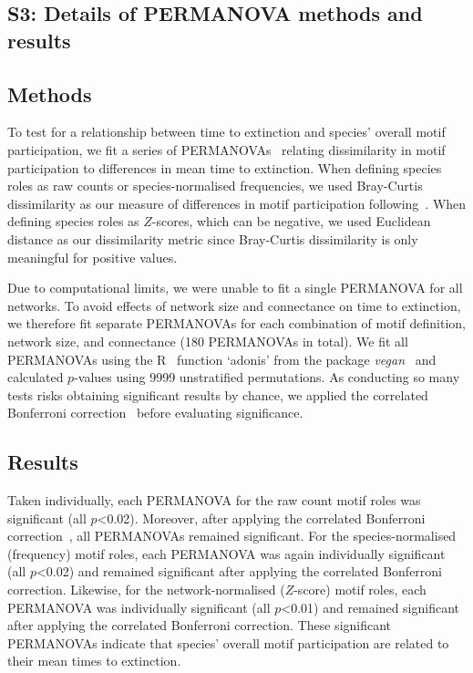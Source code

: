 \documentclass[12pt]{article}
\begin{document}
\begin{spacing}{2.0}
\clearpage


\section*{S3: Details of PERMANOVA methods and results}

	\subsection*{Methods}


		To test for a relationship between time to extinction and species' overall motif participation, we fit a series of PERMANOVAs~\citep{Anderson2001} relating dissimilarity in motif participation to differences in mean time to extinction.
		When defining species roles as raw counts or species-normalised frequencies, we used Bray-Curtis dissimilarity as our measure of differences in motif participation following~\citet{Baker2015,Cirtwill2015}.
		When defining species roles as $Z$-scores, which can be negative, we used Euclidean distance as our dissimilarity metric since Bray-Curtis dissimilarity is only meaningful for positive values.


		Due to computational limits, we were unable to fit a single PERMANOVA for all networks.
		To avoid effects of network size and connectance on time to extinction, we therefore fit separate PERMANOVAs for each combination of motif definition, network size, and connectance (180 PERMANOVAs in total).
		We fit all PERMANOVAs using the R~\citep{R} function `adonis' from the package \emph{vegan}~\citep{vegan} and calculated $p$-values using 9999 unstratified permutations.
		As conducting so many tests risks obtaining significant results by chance, we applied the correlated Bonferroni correction~\citep{Drezner2016} before evaluating significance.

	\subsection*{Results}


		Taken individually, each PERMANOVA for the raw count motif roles was significant (all $p$\textless0.02). Moreover, after applying the correlated Bonferroni correction~\citep{Drezner2016}, all PERMANOVAs remained significant.
		For the species-normalised (frequency) motif roles, each PERMANOVA was again individually significant (all $p$\textless0.02) and remained significant after applying the correlated Bonferroni correction.
		Likewise, for the network-normalised ($Z$-score) motif roles, each PERMANOVA was individually significant (all $p$\textless0.01) and remained significant after applying the correlated Bonferroni correction.
		These significant PERMANOVAs indicate that species' overall motif participation are related to their mean times to extinction.


\end{spacing}
\end{document}
